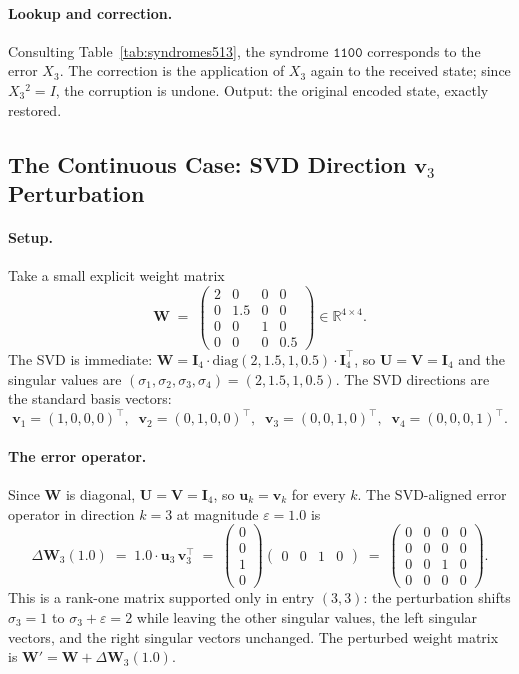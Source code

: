 \documentclass[11pt,a4paper]{article}
\theoremstyle{definition}
\newcommand{\Wm}{\mathbf{W}}
\newcommand{\Um}{\mathbf{U}}
\newcommand{\Vm}{\mathbf{V}}
\newcommand{\Imat}{\mathbf{I}}
\newcommand{\vk}[1][]{\mathbf{v}_{#1}}
\newcommand{\uk}[1][]{\mathbf{u}_{#1}}
\newcommand{\Rbb}{\mathbb{R}}
\begin{document}
\paragraph{Lookup and correction.}
Consulting Table~\ref{tab:syndromes513}, the syndrome $\mathtt{1100}$ corresponds to the error $X_3$. The correction is the application of $X_3$ again to the received state; since $X_3{}^2 = I$, the corruption is undone. Output: the original encoded state, exactly restored.

\subsection{The Continuous Case: SVD Direction \texorpdfstring{$\vk[3]$}{v3} Perturbation}
\label{sec:appB_continuous}

\paragraph{Setup.}
Take a small explicit weight matrix
\[
  \Wm \;=\; \begin{pmatrix}
    2 & 0 & 0 & 0 \\
    0 & 1.5 & 0 & 0 \\
    0 & 0 & 1 & 0 \\
    0 & 0 & 0 & 0.5
  \end{pmatrix} \in \Rbb^{4\times 4}.
\]
The SVD is immediate: $\Wm = \Imat_4 \cdot \mathrm{diag}(2, 1.5, 1, 0.5) \cdot \Imat_4^\top$, so $\Um = \Vm = \Imat_4$ and the singular values are $(\sigma_1, \sigma_2, \sigma_3, \sigma_4) = (2, 1.5, 1, 0.5)$. The SVD directions are the standard basis vectors:
\[
  \vk[1] = (1,0,0,0)^\top,\;\;
  \vk[2] = (0,1,0,0)^\top,\;\;
  \vk[3] = (0,0,1,0)^\top,\;\;
  \vk[4] = (0,0,0,1)^\top.
\]

\paragraph{The error operator.}
Since $\Wm$ is diagonal, $\Um = \Vm = \Imat_4$, so $\uk[k] = \vk[k]$ for every $k$. The SVD-aligned error operator in direction $k=3$ at magnitude $\varepsilon = 1.0$ is
\[
  \Delta\Wm_3(1.0) \;=\; 1.0\cdot \uk[3]\,\vk[3]^\top
  \;=\; \begin{pmatrix}0\\0\\1\\0\end{pmatrix}
        \begin{pmatrix}0 & 0 & 1 & 0\end{pmatrix}
  \;=\; \begin{pmatrix}
    0 & 0 & 0 & 0 \\
    0 & 0 & 0 & 0 \\
    0 & 0 & 1 & 0 \\
    0 & 0 & 0 & 0
  \end{pmatrix} .
\]
This is a rank-one matrix supported only in entry $(3,3)$: the perturbation shifts $\sigma_3 = 1$ to $\sigma_3 + \varepsilon = 2$ while leaving the other singular values, the left singular vectors, and the right singular vectors unchanged. The perturbed weight matrix is $\Wm' = \Wm + \Delta\Wm_3(1.0)$.
\end{document}

